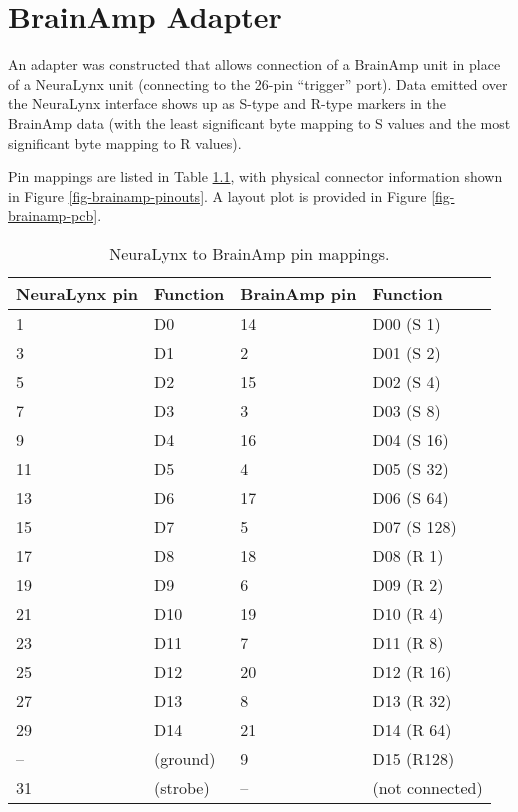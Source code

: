 %

\chapter{BrainAmp Adapter}
\label{sect-brainamp}

An adapter was constructed that allows connection of a BrainAmp unit in 
place of a NeuraLynx unit (connecting to the 26-pin ``trigger'' port). 
Data emitted over the NeuraLynx interface shows up as S-type and R-type 
markers in the BrainAmp data (with the least significant byte mapping to 
S values and the most significant byte mapping to R values).

Pin mappings are listed in Table \ref{tab-brainamp-pins}, with physical 
connector information shown in Figure \ref{fig-brainamp-pinouts}. A layout 
plot is provided in Figure \ref{fig-brainamp-pcb}.

\begin{table}[hp]
\begin{center}
\begin{tabular}{|ll|ll|}
%
\hline
\textbf{NeuraLynx pin} & \textbf{Function} & \textbf{BrainAmp pin} & 
\textbf{Function} \\
\hline
 1 & D0  & 14 & D00 (S 1) \\
 3 & D1  &  2 & D01 (S 2) \\
 5 & D2  & 15 & D02 (S 4) \\
 7 & D3  &  3 & D03 (S 8) \\
\hline
 9 & D4  & 16 & D04 (S 16) \\
11 & D5  &  4 & D05 (S 32) \\
13 & D6  & 17 & D06 (S 64) \\
15 & D7  &  5 & D07 (S 128) \\
\hline
17 & D8  & 18 & D08 (R 1) \\
19 & D9  &  6 & D09 (R 2) \\
21 & D10 & 19 & D10 (R 4) \\
23 & D11 &  7 & D11 (R 8) \\
\hline
25 & D12 & 20 & D12 (R 16) \\
27 & D13 &  8 & D13 (R 32) \\
29 & D14 & 21 & D14 (R 64) \\
-- & (ground) & 9 & D15 (R128) \\
31 & (strobe) & -- & (not connected) \\
\hline
%
\end{tabular}
\end{center}
\caption{NeuraLynx to BrainAmp pin mappings.}\label{tab-brainamp-pins}
\end{table}

